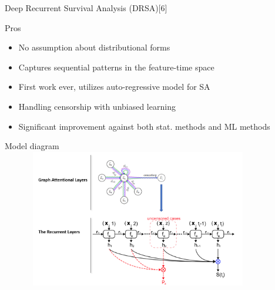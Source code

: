 \begin{frame}{Deep Recurrent Survival Analysis (DRSA)[6]}

	\begin{block}{Pros}
		\begin{itemize}
			\item No assumption about distributional forms
			\item Captures sequential patterns in the feature-time space
			\item First work ever, utilizes auto-regressive model for SA
			\item Handling censorship with unbiased learning
			\item Significant improvement against both stat. methods and ML methods
		\end{itemize}
		
	\end{block}
	
\end{frame}

\begin{frame}{Model diagram}
	\includegraphics[width=12cm, height=6cm, scale=0.4]{images/03.png}

	
\end{frame}


	
	




% 

